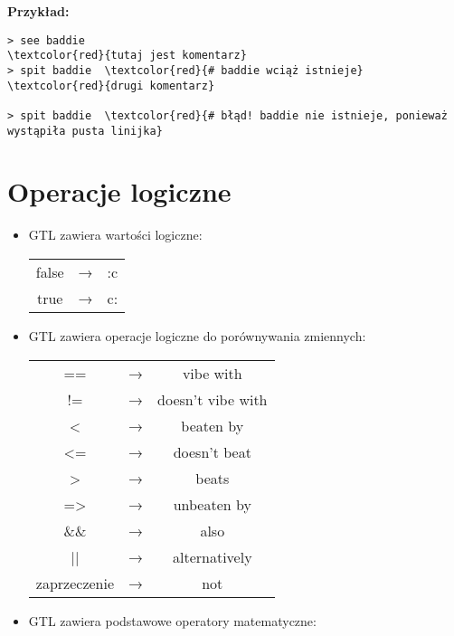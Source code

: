 \documentclass{article}
\begin{document}
\textbf{Przykład:}
{\color{green}
\begin{Verbatim}[commandchars=\\\{\}]
> see baddie
\textcolor{red}{tutaj jest komentarz}
> spit baddie  \textcolor{red}{# baddie wciąż istnieje}
\textcolor{red}{drugi komentarz}

> spit baddie  \textcolor{red}{# błąd! baddie nie istnieje, ponieważ wystąpiła pusta linijka}
\end{Verbatim}
}
\section{Operacje logiczne}

\begin{itemize}


\item GTL zawiera wartości logiczne:

\begin{table}[H]
\centering
\begin{tabular}{ccc}
false          & → & :c   \\
true           & → & c:
\end{tabular}
\end{table}


\item GTL zawiera operacje logiczne do porównywania zmiennych:

\begin{table}[H]
\centering
\begin{tabular}{ccc}
==              & → & vibe with   \\
!=              & → & doesn't vibe with       \\
\textless{}     & → & beaten by      \\
\textless{}=    & → & doesn't beat   \\
\textgreater{}  & → & beats          \\
=\textgreater{} & → & unbeaten by    \\
\&\&            & → & also            \\
||              & → & alternatively  \\
zaprzeczenie    & → & not
\end{tabular}
\end{table}


\item GTL zawiera podstawowe operatory matematyczne:


\end{itemize}
\end{document}
